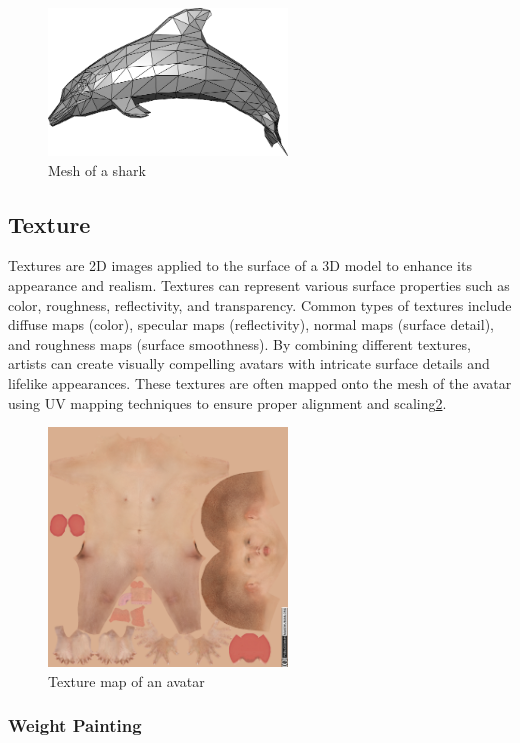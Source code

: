 \documentclass[../../main.tex]{subfiles}
\begin{document}
\begin{figure}
  \centering \includegraphics[width = 2.5in]{chapters/background_work/images/mesh.png}
  \caption{Mesh of a shark}
  \label{fig:mesh}
\end{figure}

\subsection{Texture}

Textures are 2D images applied to the surface of a 3D model to enhance its appearance and realism. Textures can represent various surface properties such as color, roughness, reflectivity, and transparency. Common types of textures include diffuse maps (color), specular maps (reflectivity), normal maps (surface detail), and roughness maps (surface smoothness). By combining different textures, artists can create visually compelling avatars with intricate surface details and lifelike appearances. These textures are often mapped onto the mesh of the avatar using UV mapping techniques to ensure proper alignment and scaling\ref{fig:texture_map}.

\begin{figure}
  \centering \includegraphics[width = 2.5in]{chapters/background_work/images/texture_map.png}
  \caption{Texture map of an avatar}
  \label{fig:texture_map}
\end{figure}

\subsubsection{Weight Painting}
\end{document}
